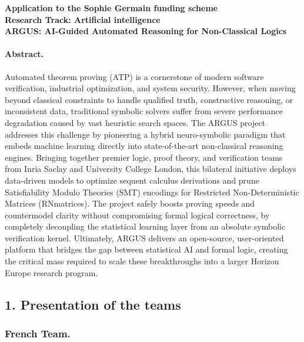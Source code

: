 \documentclass[a4paper]{article}
\begin{document}
\begin{center}
  \bf Application to the Sophie Germain funding scheme
  \\[1ex]
  \normalsize\rm
  Research Track: Artificial intelligence
    \\[2ex]
  \large\bf  ARGUS: AI-Guided Automated Reasoning for Non-Classical Logics
\end{center}

\paragraph*{Abstract.}

Automated theorem proving (ATP) is a cornerstone of modern software verification, industrial optimization, and system security. However, when moving beyond classical constraints to handle qualified truth, constructive reasoning, or inconsistent data, traditional symbolic solvers suffer from severe performance degradation caused by vast heuristic search spaces. The ARGUS project addresses this challenge by pioneering a hybrid neuro-symbolic paradigm that embeds machine learning directly into state-of-the-art non-classical reasoning engines. Bringing together premier logic, proof theory, and verification teams from Inria Saclay and University College London, this bilateral initiative deploys data-driven models to optimize sequent calculus derivations and prune Satisfiability Modulo Theories (SMT) encodings for Restricted Non-Deterministic Matrices (RNmatrices). The project safely boosts proving speeds and countermodel clarity without compromising formal logical correctness, by completely decoupling the statistical learning layer from an absolute symbolic verification kernel. Ultimately, ARGUS delivers an open-source, user-oriented platform that bridges the gap between statistical AI and formal logic, creating the critical mass required to scale these breakthroughs into a larger Horizon Europe research program.

\subsection*{1. Presentation of the teams}

\subsubsection*{French Team.}
\end{document}
